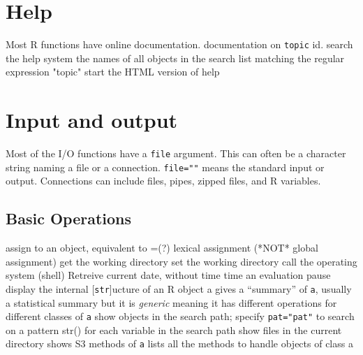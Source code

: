 
\def\content{\uppercase{r}}
\def\shortcontent{\content}
\def\versionnumber{1.4}  %
\def\version{v\versionnumber\ \month\ \year}


\mytitle

\shortintro
\shortintroR


\section{Help}{Most R functions have online documentation.}
	{documentation on {\tt topic}}
	{id.}
	{search the help system}
	{the names of all objects in the search list
    matching the regular ex\-pres\-sion "to\-pic"}
	{start the HTML version of help}

\section{Input and output}{Most of the I/O functions have a {\tt file}
argument. This can often be a character string naming a file or a connection.
{\tt file=""} means the standard input or output. Connections can include
files, pipes, zipped files, and R variables. }

\subsection{Basic Operations}{}
\cmdS{<-}	{assign to an object, equivalent to =(?)}
\cmdS{<<-}	{lexical assignment (*NOT* global assignment)}
	{get the working directory}
	{set the working directory}
	{call the operating system (shell)}
	{Retreive current date, without time}
	{time an evaluation}
	{pause}
	{display the internal [{\tt str}]ucture of an R object a}
	{gives a ``summary'' of {\tt a}, usually a statistical summary but it is {\it generic} meaning it has different operations for different classes of {\tt a}}
	{show objects in the search path; specify {\tt pat="pat"} to search on a pattern}
	{str() for each variable in the search path}
	{show files in the current directory}
	{shows S3 methods of {\tt a}}
	{lists all the methods to handle objects of class a}

